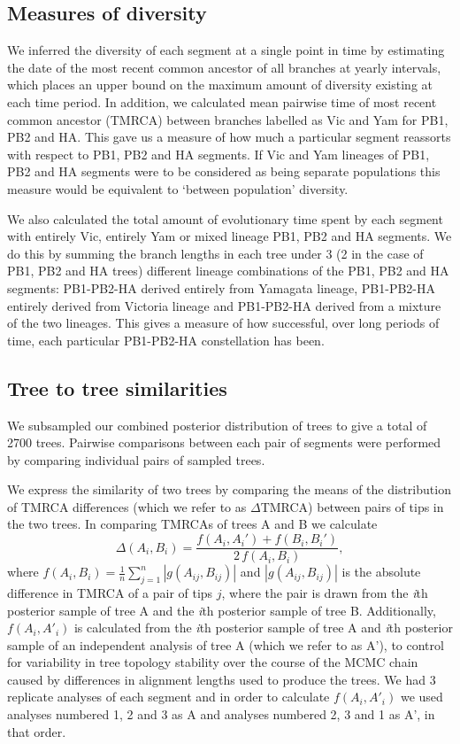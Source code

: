 \documentclass[11pt,oneside,letterpaper]{article}
\begin{document}
\subsection*{Measures of diversity}
We inferred the diversity of each segment at a single point in time by estimating the date of the most recent common ancestor of all branches at yearly intervals, which places an upper bound on the maximum amount of diversity existing at each time period.
In addition, we calculated mean pairwise time of most recent common ancestor (TMRCA) between branches labelled as Vic and Yam for PB1, PB2 and HA.
This gave us a measure of how much a particular segment reassorts with respect to PB1, PB2 and HA segments.
If Vic and Yam lineages of PB1, PB2 and HA segments were to be considered as being separate populations this measure would be equivalent to `between population' diversity.

We also calculated the total amount of evolutionary time spent by each segment with entirely Vic, entirely Yam or mixed lineage PB1, PB2 and HA segments.
We do this by summing the branch lengths in each tree under 3 (2 in the case of PB1, PB2 and HA trees) different lineage combinations of the PB1, PB2 and HA segments: PB1-PB2-HA derived entirely from Yamagata lineage, PB1-PB2-HA entirely derived from Victoria lineage and PB1-PB2-HA derived from a mixture of the two lineages.
This gives a measure of how successful, over long periods of time, each particular PB1-PB2-HA constellation has been.

\subsection*{Tree to tree similarities}
We subsampled our combined posterior distribution of trees to give a total of 2700 trees.
Pairwise comparisons between each pair of segments were performed by comparing individual pairs of sampled trees.

We express the similarity of two trees by comparing the means of the distribution of TMRCA differences (which we refer to as $\Delta$TMRCA) between pairs of tips in the two trees.
In comparing TMRCAs of trees A and B we calculate
\begin{equation}
\Delta(A_i, B_i) = \frac{f(A_i, A_i') + f(B_i, B_i')}{2 \, f(A_i, B_i)},
\end{equation}
where $f(A_i, B_i) = \frac{1}{n}\sum_{j=1}^n |g(A_{ij}, B_{ij})|$ and $|g(A_{ij},B_{ij})|$ is the absolute difference in TMRCA of a pair of tips $j$, where the pair is drawn from the \textit{i}th posterior sample of tree A and the \textit{i}th posterior sample of tree B.
Additionally, $f(A_i,A'_i)$ is calculated from the \textit{i}th posterior sample of tree A and \textit{i}th posterior sample of an independent analysis of tree A (which we refer to as A'), to control for variability in tree topology stability over the course of the MCMC chain caused by differences in alignment lengths used to produce the trees.
We had 3 replicate analyses of each segment and in order to calculate $f(A_i,A'_i)$ we used analyses numbered 1, 2 and 3 as A and analyses numbered 2, 3 and 1 as A', in that order.
\end{document}
